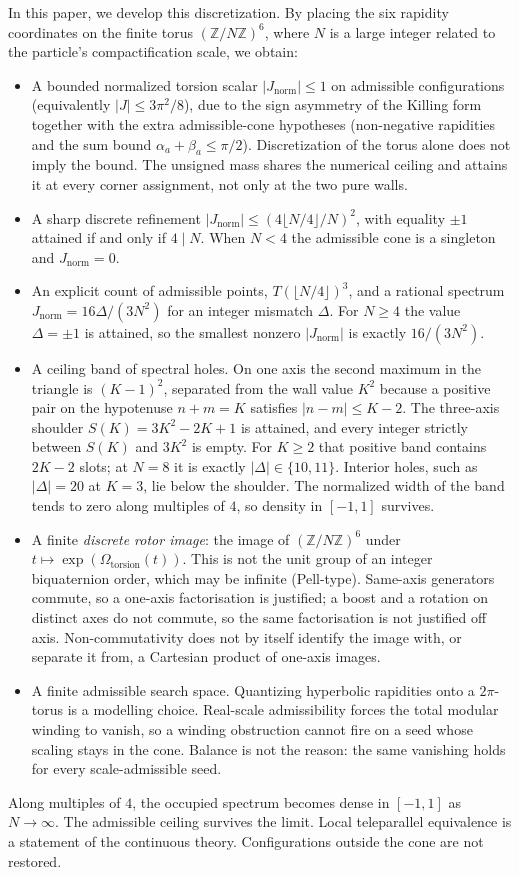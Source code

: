 \documentclass[a4paper]{article}
\theoremstyle{definition}
\newcommand{\Jnorm}{J_{\mathrm{norm}}}
\begin{document}
In this paper, we develop this discretization. By placing the six rapidity coordinates on the finite torus $(\mathbb{Z}/N\mathbb{Z})^6$, where $N$ is a large integer related to the particle's compactification scale, we obtain:
\begin{itemize}
  \item A bounded normalized torsion scalar $|\Jnorm| \leq 1$ on admissible configurations (equivalently $|J| \leq 3\pi^2/8$), due to the sign asymmetry of the Killing form together with the extra admissible-cone hypotheses (non-negative rapidities and the sum bound $\alpha_a+\beta_a\le\pi/2$). Discretization of the torus alone does not imply the bound. The unsigned mass shares the numerical ceiling and attains it at every corner assignment, not only at the two pure walls.
  \item A sharp discrete refinement $|\Jnorm|\leq (4\lfloor N/4\rfloor/N)^2$, with equality $\pm 1$ attained if and only if $4\mid N$. When $N<4$ the admissible cone is a singleton and $\Jnorm=0$.
  \item An explicit count of admissible points, $T(\lfloor N/4\rfloor)^3$, and a rational spectrum $\Jnorm=16\Delta/(3N^2)$ for an integer mismatch $\Delta$. For $N\geq 4$ the value $\Delta=\pm 1$ is attained, so the smallest nonzero $|\Jnorm|$ is exactly $16/(3N^2)$.
  \item A ceiling band of spectral holes. On one axis the second maximum in the triangle is $(K-1)^2$, separated from the wall value $K^2$ because a positive pair on the hypotenuse $n+m=K$ satisfies $|n-m|\le K-2$. The three-axis shoulder $S(K)=3K^2-2K+1$ is attained, and every integer strictly between $S(K)$ and $3K^2$ is empty. For $K\ge 2$ that positive band contains $2K-2$ slots; at $N=8$ it is exactly $|\Delta|\in\{10,11\}$. Interior holes, such as $|\Delta|=20$ at $K=3$, lie below the shoulder. The normalized width of the band tends to zero along multiples of $4$, so density in $[-1,1]$ survives.
  \item A finite \emph{discrete rotor image}: the image of $(\mathbb{Z}/N\mathbb{Z})^6$ under $t\mapsto\exp(\Omega_{\mathrm{torsion}}(t))$. This is not the unit group of an integer biquaternion order, which may be infinite (Pell-type). Same-axis generators commute, so a one-axis factorisation is justified; a boost and a rotation on distinct axes do not commute, so the same factorisation is not justified off axis. Non-commutativity does not by itself identify the image with, or separate it from, a Cartesian product of one-axis images.
  \item A finite admissible search space. Quantizing hyperbolic rapidities onto a $2\pi$-torus is a modelling choice. Real-scale admissibility forces the total modular winding to vanish, so a winding obstruction cannot fire on a seed whose scaling stays in the cone. Balance is not the reason: the same vanishing holds for every scale-admissible seed.
\end{itemize}
Along multiples of $4$, the occupied spectrum becomes dense in $[-1,1]$ as $N\to\infty$. The admissible ceiling survives the limit. Local teleparallel equivalence is a statement of the continuous theory. Configurations outside the cone are not restored.
\end{document}
